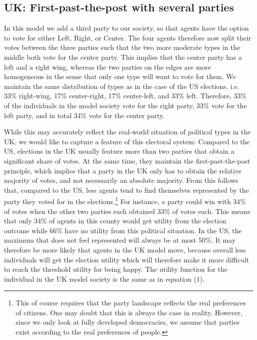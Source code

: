 \documentclass[12pt, a4paper]{article}
\begin{document}
	\subsection{UK: First-past-the-post with several parties}
	In this model we add a third party to our society, so that agents have the option to vote for either Left, Right, or Center. The four agents therefore now split their votes between the three parties such that the two more moderate types in the middle both vote for the center party. This implies that the center party has a left and a right wing, whereas the two parties on the edges are more homogeneous in the sense that only one type will want to vote for them. We maintain the same distribution of types as in the case of the US elections, i.e. 33\% right-wing, 17\% center-right, 17\% center-left, and 33\% left. Therefore, 33\% of the individuals in the model society vote for the right party, 33\% vote for the left party, and in total 34\% vote for the center party.
	
	While this may accurately reflect the real-world situation of political types in the UK, we would like to capture a feature of this electoral system: Compared to the US, elections in the UK usually feature more than two parties that obtain a significant share of votes. At the same time, they maintain the first-past-the-post principle, which implies that a party in the UK only has to obtain the relative majority of votes, and not necessarily an absolute majority. From this follows that, compared to the US, less agents tend to find themselves represented by the party they voted for in the elections.\footnote{This of course requires that the party landscape reflects the real preferences of citizens. One may doubt that this is always the case in reality. However, since we only look at fully developed democracies, we assume that parties exist according to the real preferences of people.} For instance, a party could win with 34\% of votes when the other two parties each obtained 33\% of votes each. This means that only 34\% of agents in this county would get utility from the election outcome while 66\% have no utility from this political situation. In the US, the maximum that does not feel represented will always be at most 50\%. It may therefore be more likely that agents in the UK model move, because overall less individuals will get the election utility which will therefore make it more difficult to reach the threshold utility for being happy.
	The utility function for the individual in the UK model society is the same as in equation (1).
	
\end{document}
